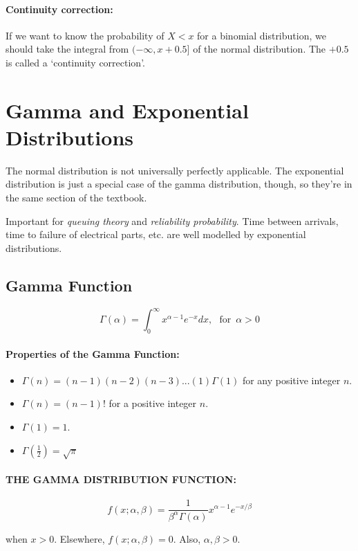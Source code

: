 \documentclass[a4paper,12pt]{report}
\begin{document}
\paragraph{Continuity correction: } If we want to know the probability of $X < x$ for a binomial distribution, we should take the integral from $(-\infty, x+0.5]$ of the normal distribution. 
The $+0.5$ is called a `continuity correction'.


\section{Gamma and Exponential Distributions}

The normal distribution is not universally perfectly applicable. The exponential distribution is just a special case of the gamma distribution, though, so they're in the same section of the textbook.

Important for \textit{queuing theory} and \textit{reliability probability}. Time between arrivals, time to failure of electrical parts, etc. are well modelled by exponential distributions.

\subsection{Gamma Function}

$$\Gamma(\alpha) = \int_0^{\infty} x^{\alpha-1}e^{-x}dx,\,\,\,\, \text{for} \,\,\, \alpha > 0$$

\paragraph{Properties of the Gamma Function: } 
\begin{itemize}
\item $\Gamma(n) = (n-1)(n-2)(n-3)...(1)\Gamma(1)$ for any positive integer $n$.
\item $\Gamma(n) = (n-1)!$ for a positive integer $n$.
\item $\Gamma(1) = 1$.
\item $\Gamma(\frac{1}{2}) = \sqrt{\pi}$
\end{itemize}

\paragraph{THE GAMMA DISTRIBUTION FUNCTION: } 
$$f(x; \alpha, \beta) = \frac{1}{\beta^\alpha \Gamma(\alpha)} x^{\alpha-1}e^{-x/\beta}$$ 

when $x > 0$. Elsewhere, $f(x; \alpha, \beta) = 0$. Also, $\alpha, \beta > 0$.
\end{document}
